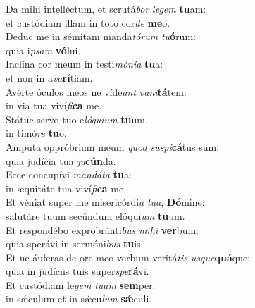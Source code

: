 \evenverse Da mihi intelléctum, et scrutá\textit{bor} \textit{le}\textit{gem} \textbf{tu}am:~\*\\
\evenverse et custódiam illam in toto cor\textit{de} \textbf{me}o.\\
\oddverse Deduc me in sémitam manda\textit{tó}\textit{rum} \textit{tu}\textbf{ó}rum:~\*\\
\oddverse quia i\textit{psam} \textbf{vó}lui.\\
\evenverse Inclína cor meum in testi\textit{mó}\textit{ni}\textit{a} \textbf{tu}a:~\*\\
\evenverse et non in a\textit{va}\textbf{rí}tiam.\\
\oddverse Avérte óculos meos ne víde\textit{ant} \textit{va}\textit{ni}\textbf{tá}tem:~\*\\
\oddverse in via tua viví\textit{fi}\textbf{ca} me.\\
\evenverse Státue servo tuo e\textit{ló}\textit{qui}\textit{um} \textbf{tu}um,~\*\\
\evenverse in timó\textit{re} \textbf{tu}o.\\
\oddverse Amputa oppróbrium meum \textit{quod} \textit{su}\textit{spi}\textbf{cá}tus sum:~\*\\
\oddverse quia judícia tua \textit{ju}\textbf{cún}da.\\
\evenverse Ecce concupívi \textit{man}\textit{dá}\textit{ta} \textbf{tu}a:~\*\\
\evenverse in æquitáte tua viví\textit{fi}\textbf{ca} me.\\
\oddverse Et véniat super me misericórdi\textit{a} \textit{tu}\textit{a}, \textbf{Dó}mine:~\*\\
\oddverse salutáre tuum secúndum elóqui\textit{um} \textbf{tu}um.\\
\evenverse Et respondébo exprobránti\textit{bus} \textit{mi}\textit{hi} \textbf{ver}bum:~\*\\
\evenverse quia sperávi in sermóni\textit{bus} \textbf{tu}is.\\
\oddverse Et ne áuferas de ore meo verbum veritá\textit{tis} \textit{us}\textit{que}\textbf{quá}que:~\*\\
\oddverse quia in judíciis tuis super\textit{spe}\textbf{rá}vi.\\
\evenverse Et custódiam le\textit{gem} \textit{tu}\textit{am} \textbf{sem}per:~\*\\
\evenverse in sǽculum et in sǽcu\textit{lum} \textbf{sǽ}culi.\\

